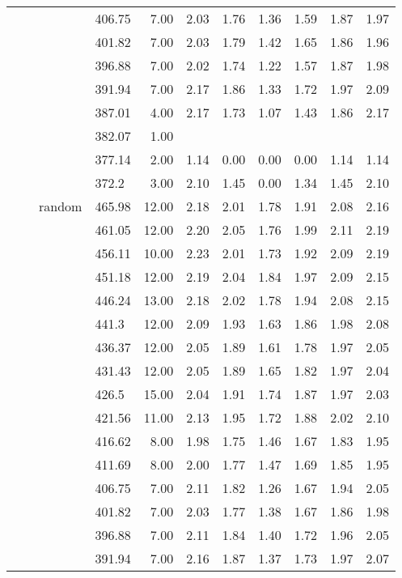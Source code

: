 \begin{longtable}{llllrrrrrrr}
   &  &  & 406.75 & 7.00 & 2.03 & 1.76 & 1.36 & 1.59 & 1.87 & 1.97 \\ 
   &  &  & 401.82 & 7.00 & 2.03 & 1.79 & 1.42 & 1.65 & 1.86 & 1.96 \\ 
   &  &  & 396.88 & 7.00 & 2.02 & 1.74 & 1.22 & 1.57 & 1.87 & 1.98 \\ 
   &  &  & 391.94 & 7.00 & 2.17 & 1.86 & 1.33 & 1.72 & 1.97 & 2.09 \\ 
   &  &  & 387.01 & 4.00 & 2.17 & 1.73 & 1.07 & 1.43 & 1.86 & 2.17 \\ 
   &  &  & 382.07 & 1.00 &  &  &  &  &  &  \\ 
   &  &  & 377.14 & 2.00 & 1.14 & 0.00 & 0.00 & 0.00 & 1.14 & 1.14 \\ 
   &  &  & 372.2 & 3.00 & 2.10 & 1.45 & 0.00 & 1.34 & 1.45 & 2.10 \\ 
   &  & random & 465.98 & 12.00 & 2.18 & 2.01 & 1.78 & 1.91 & 2.08 & 2.16 \\ 
   &  &  & 461.05 & 12.00 & 2.20 & 2.05 & 1.76 & 1.99 & 2.11 & 2.19 \\ 
   &  &  & 456.11 & 10.00 & 2.23 & 2.01 & 1.73 & 1.92 & 2.09 & 2.19 \\ 
   &  &  & 451.18 & 12.00 & 2.19 & 2.04 & 1.84 & 1.97 & 2.09 & 2.15 \\ 
   &  &  & 446.24 & 13.00 & 2.18 & 2.02 & 1.78 & 1.94 & 2.08 & 2.15 \\ 
   &  &  & 441.3 & 12.00 & 2.09 & 1.93 & 1.63 & 1.86 & 1.98 & 2.08 \\ 
   &  &  & 436.37 & 12.00 & 2.05 & 1.89 & 1.61 & 1.78 & 1.97 & 2.05 \\ 
   &  &  & 431.43 & 12.00 & 2.05 & 1.89 & 1.65 & 1.82 & 1.97 & 2.04 \\ 
   &  &  & 426.5 & 15.00 & 2.04 & 1.91 & 1.74 & 1.87 & 1.97 & 2.03 \\ 
   &  &  & 421.56 & 11.00 & 2.13 & 1.95 & 1.72 & 1.88 & 2.02 & 2.10 \\ 
   &  &  & 416.62 & 8.00 & 1.98 & 1.75 & 1.46 & 1.67 & 1.83 & 1.95 \\ 
   &  &  & 411.69 & 8.00 & 2.00 & 1.77 & 1.47 & 1.69 & 1.85 & 1.95 \\ 
   &  &  & 406.75 & 7.00 & 2.11 & 1.82 & 1.26 & 1.67 & 1.94 & 2.05 \\ 
   &  &  & 401.82 & 7.00 & 2.03 & 1.77 & 1.38 & 1.67 & 1.86 & 1.98 \\ 
   &  &  & 396.88 & 7.00 & 2.11 & 1.84 & 1.40 & 1.72 & 1.96 & 2.05 \\ 
   &  &  & 391.94 & 7.00 & 2.16 & 1.87 & 1.37 & 1.73 & 1.97 & 2.07 \\ 

\end{longtable}
